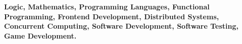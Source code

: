 
\textbf{\small Logic, Mathematics, Programming Languages, 
Functional Programming, Frontend Development, Distributed Systems, 
Concurrent Computing,
Software Development, Software Testing, Game Development.}
